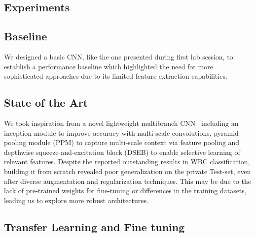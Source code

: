 \documentclass[11pt]{article}
\begin{document}
\begin{multicols}{2}
    \section{Experiments}

    \subsection{Baseline}

    We designed a basic CNN,  like the one presented during first lab session, to establish a performance baseline which highlighted the need for more sophisticated approaches due to its limited feature extraction capabilities.

    \subsection{State of the Art}

    We took inspiration from a novel lightweight multibranch CNN~\cite{Firat2024} including an inception module to improve accuracy with multi-scale convolutions, pyramid pooling module (PPM) to capture multi-scale context via feature pooling and depthwise squeeze-and-excitation block (DSEB) to  enable selective learning of relevant features. Despite the reported outstanding results in WBC classification, building it from scratch revealed poor generalization on the private Test-set, even after diverse augmentation and regularization techniques. This may be due to the lack of pre-trained weights for fine-tuning or differences in the training datasets, leading us to explore more robust architectures.

    \subsection{Transfer Learning and Fine tuning}


\end{multicols}
\end{document}
